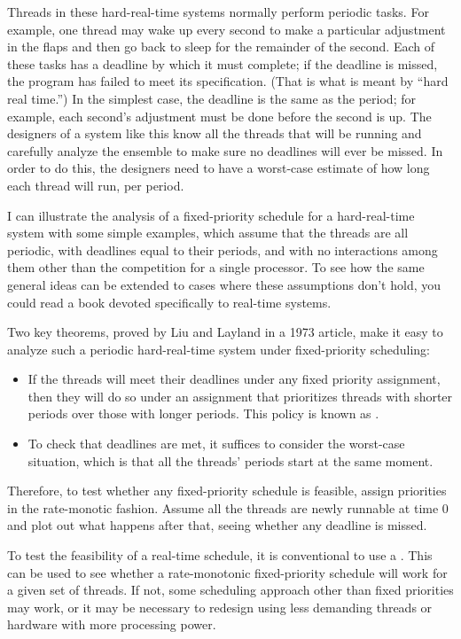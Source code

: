 Threads in these hard-real-time systems normally perform periodic
tasks.  For example, one thread may wake up every second to make a
particular adjustment in the flaps and then go back to sleep for the remainder of the
second.  Each of these tasks has a deadline by which it must complete;
if the deadline is missed, the program has failed to meet its
specification.  (That is what is meant by ``hard real time.'')  In the
simplest case, the deadline is the same as the period; for example, each
second's adjustment must be done before the second is up.  The
designers of a system like this know all the threads that will be
running and carefully analyze the ensemble to make sure no deadlines
will ever be missed.  In order to do this, the designers need to have
a worst-case estimate of how long each thread will run, per period.

I can illustrate the analysis of a fixed-priority schedule for a
hard-real-time system with some simple examples, which assume
that the threads are all periodic, with deadlines equal to their
periods, and with no interactions among them other than the
competition for a single processor.  To see how the same general ideas
can be extended to cases where these assumptions don't hold, you could
read a book devoted specifically to real-time systems.

Two key theorems, proved by Liu and
Layland in a 1973 article, make it easy
to analyze such a periodic hard-real-time system under fixed-priority
scheduling:
\begin{itemize}
\item
If the threads will meet their deadlines under any fixed priority
assignment, then they will do so under an assignment that prioritizes
threads with shorter periods over those with longer periods.
This policy is known as
.
\item
To check that deadlines are met, it suffices to consider the worst-case situation, which is that all the threads' periods start at the
same moment.
\end{itemize}
Therefore, to test whether any fixed-priority schedule is feasible,
assign priorities in the rate-monotic fashion.  Assume all the threads
are newly runnable at time 0 and plot out what happens after
that, seeing whether any deadline is missed.

To test the feasibility of a real-time schedule, it is conventional to
use a .  This can be
used to see whether a rate-monotonic fixed-priority schedule will work
for a given set of threads.  If not, some scheduling approach other
than fixed priorities may work, or it may be necessary to redesign
using less demanding threads or hardware with more processing power.

